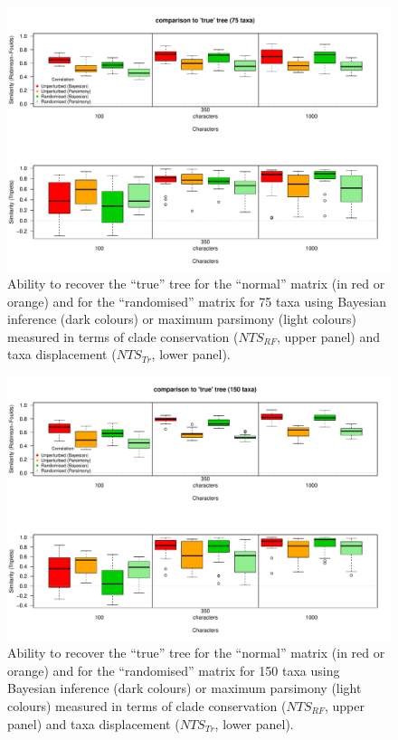 \documentclass[12pt,letterpaper]{article}
\begin{document}
\begin{figure}[!htbp]
\centering
   \includegraphics[width=1\textwidth]{../Figures/75t_true_tree.pdf}
\caption{Ability to recover the ``true'' tree for the ``normal'' matrix (in red or orange) and for the ``randomised'' matrix for 75 taxa using Bayesian inference (dark colours) or maximum parsimony (light colours) measured in terms of clade conservation ($NTS_{RF}$, upper panel) and taxa displacement ($NTS_{Tr}$, lower panel).}
\end{figure}

\begin{figure}[!htbp]
\centering
   \includegraphics[width=1\textwidth]{../Figures/150t_true_tree.pdf}
\caption{Ability to recover the ``true'' tree for the ``normal'' matrix (in red or orange) and for the ``randomised'' matrix for 150 taxa using Bayesian inference (dark colours) or maximum parsimony (light colours) measured in terms of clade conservation ($NTS_{RF}$, upper panel) and taxa displacement ($NTS_{Tr}$, lower panel).}
\end{figure}
\end{document}

